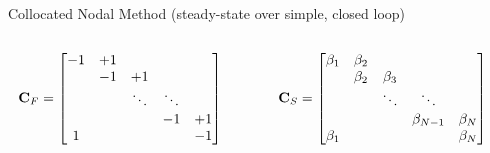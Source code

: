 \documentclass[10pt,t,xcolor=table]{beamer}
\begin{document}
\begin{frame}{Collocated Nodal Method {\small(steady-state over simple, closed loop)}}
        \begin{columns}
            \begin{column}{0.48\textwidth}
                \begin{align}
                        \mathbf{C}_F &=  
                                \begin{bmatrix}
                                    -1     & +1  &        &        &          \\
                                           & -1  & +1     &        &          \\
                                           &     & \ddots & \ddots &          \\
                                           &     &        &  -1    & +1       \\
                                    1      &     &        &        & -1
                                \end{bmatrix}\notag
                \end{align}
            \end{column}
            \begin{column}{0.48\textwidth}
                \begin{align}
                        \mathbf{C}_S &=  
                                \begin{bmatrix}
                                    \Weight_1 & \Weight_2 &          &              &          \\
                                              & \Weight_2 & \Weight_3 &              &          \\
                                              &          & \ddots   & \ddots       &          \\
                                              &          &          & \Weight_{N-1} & \Weight_N \\
                                    \Weight_1 &          &          &              & \Weight_N
                                \end{bmatrix}\notag
                \end{align}
            \end{column}
        \end{columns}
    \end{frame}
    
    
    
\end{document}
